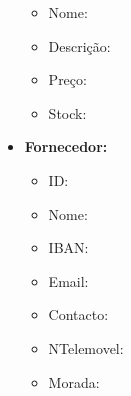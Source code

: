 \documentclass[a4paper,12pt]{scrreprt}
\begin{document}
\begin{itemize}
\begin{itemize}
                     \item{Nome:}
                       
                     \item{Descrição:}
                       
                     \item{Preço:}
                       
                     \item{Stock:}
                       
                     \end{itemize}
                 \item{\textbf{Fornecedor:}}
                     \begin{itemize}
                     \item{ID:}
                       
                     \item{Nome:}
                       
                     \item{IBAN:}
                       
                     \item{Email:}
                       
                     \item{Contacto:}
                       
                     \item{NTelemovel:}
                       
                     \item{Morada:}
                       
                     \end{itemize}
             \end{itemize}
\end{document}
